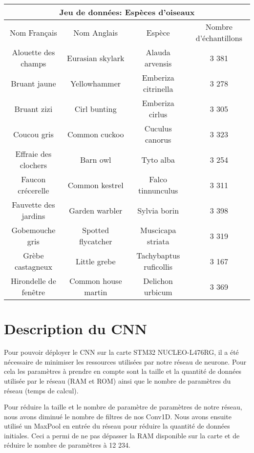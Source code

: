 \begin{center}
  \begin{tabular}{ |c|c|c|c| }
   \hline
   \multicolumn{4}{|c|}{Jeu de données: Espèces d'oiseaux} \\
   \hline
    Nom Français & Nom Anglais & Espèce & Nombre d'échantillons\\
   \hline
    Alouette des champs & Eurasian skylark & Alauda arvensis & 3 381\\
    Bruant jaune & Yellowhammer & Emberiza citrinella & 3 278\\
    Bruant zizi & Cirl bunting & Emberiza cirlus & 3 305\\
    Coucou gris & Common cuckoo & Cuculus canorus & 3 323\\
    Effraie des clochers & Barn owl & Tyto alba & 3 254\\
    Faucon crécerelle & Common kestrel & Falco tinnunculus & 3 311\\
    Fauvette des jardins & Garden warbler & Sylvia borin & 3 398\\
    Gobemouche gris & Spotted flycatcher & Muscicapa striata & 3 319\\
    Grèbe castagneux & Little grebe & Tachybaptus ruficollis & 3 167\\
    Hirondelle de fenêtre & Common house martin & Delichon urbicum & 3 369\\
   \hline
  \end{tabular}
\end{center}

\section{Description du CNN}

Pour pouvoir déployer le CNN sur la carte STM32 NUCLEO-L476RG, il a été nécessaire 
de minimiser les ressources utilisées par notre réseau de neurone. Pour cela les paramètres à prendre en compte sont
la taille et la quantité de données utilisée par le réseau (RAM et ROM) ainsi que le nombre 
de paramètres du réseau (temps de calcul).

Pour réduire la taille et le nombre de paramètre de paramètres de notre réseau, nous avons diminué le nombre de filtres de nos
Conv1D. Nous avons ensuite utilisé un MaxPool en entrée du réseau pour réduire la quantité de données initiales. 
Ceci a permi de ne pas dépasser la RAM disponible sur la carte et de réduire le nombre de paramètres à 12 234.

